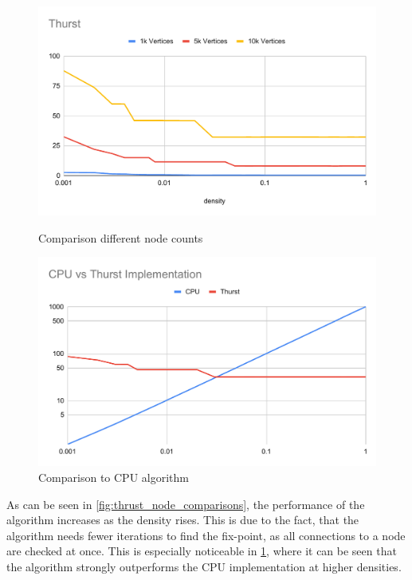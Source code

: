 \documentclass[letta4 paper]{article}
\numberwithin{equation}{section}
\newcommand{\0}{\mathbf{0}}
\begin{document}
\begin{figure}[!h]
    \centering
    \begin{minipage}{.5\textwidth}
    	\centering
    	\includegraphics[width=\linewidth]{img/thrust/nodes.pdf}
    	\caption{Comparison different node counts}
    	\label{fig:thrust_node_comparisons}
    \end{minipage}%
    \begin{minipage}{.5\textwidth}
    	\centering
    	\includegraphics[width=\linewidth]{img/thrust/cpu.pdf}
    	\caption{Comparison to CPU algorithm}
    	\label{fig:thrust_cpu_comparison}
    \end{minipage}
\end{figure}

As can be seen in \ref{fig:thrust_node_comparisons}, the performance of the algorithm increases as the density rises. This is due to the fact, that the algorithm needs fewer iterations to find the fix-point, as all connections to a node are checked at once. This is especially noticeable in \ref{fig:thrust_cpu_comparison}, where it can be seen that the algorithm strongly outperforms the CPU implementation at higher densities.
\end{document}
